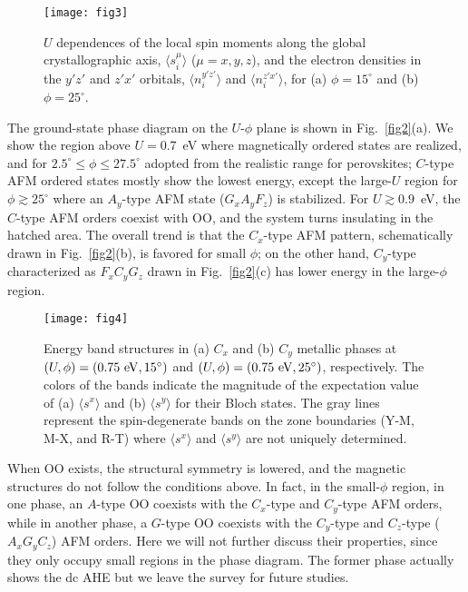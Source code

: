 \documentclass[aps,twocolumn,prb,preprintnumbers,amsmath,amssymb]{revtex4-2}
\begin{document}
\begin{figure}
\begin{center}
\texttt{[image: fig3]}
\end{center}
\caption{
$U$ dependences of the local spin moments along the global crystallographic axis, $\langle s_i^\mu \rangle$ ($\mu=x,y,z$), 
 and the electron densities in the $y'z'$ and $z'x'$ orbitals, $\langle n_i^{y'z'} \rangle$ and  $\langle n_i^{z'x'} \rangle$, 
 for (a) $\phi = 15^\circ$ and (b) $\phi = 25^\circ$. 
}
\label{fig3}
\end{figure}
The ground-state phase diagram on the $U$-$\phi$ plane is shown in Fig.~\ref{fig2}(a). 
We show the region above $U = 0.7$~eV where magnetically ordered states are realized, 
 and for $2.5^\circ \leq \phi \leq 27.5^\circ$ adopted from the realistic range for perovskites; 
 $C$-type AFM ordered states mostly show the lowest energy, 
 except the large-$U$ region for $\phi \gtrsim 25^\circ$ where an $A_y$-type AFM state ($G_x A_y F_z$) is stabilized. 
For $U \gtrsim 0.9$~eV, the $C$-type AFM orders coexist with OO, 
 and the system turns insulating in the hatched area. 
The overall trend is that the $C_x$-type AFM pattern, 
 schematically drawn in Fig.~\ref{fig2}(b), is favored for small $\phi$; 
 on the other hand, $C_y$-type characterized as $F_x C_y G_z$ drawn
 in Fig.~\ref{fig2}(c) has lower energy in the large-$\phi$ region. 
\begin{figure*}
\begin{center}
\texttt{[image: fig4]}
\end{center}
\caption{
Energy band structures in (a) $C_x$  and (b) $C_y$ metallic phases 
 at $(U, \phi) = (0.75 \ \rm{eV}, 15^\circ)$ and $(U, \phi) = (0.75 \ \rm{eV}, 25^\circ)$, respectively. 
The colors of the bands indicate the magnitude of the expectation value of 
 (a) $\langle s^x \rangle$ and (b) $\langle s^y \rangle$ for their Bloch states. 
The gray lines represent the spin-degenerate bands on the zone boundaries (Y-M, M-X, and R-T) 
 where $\langle s^x \rangle$ and $\langle s^y \rangle$ are not uniquely determined. 
}
\label{fig4}
\end{figure*}

When OO exists, the structural symmetry is lowered, 
 and the magnetic structures do not follow the conditions above. 
In fact, in the small-$\phi$ region,  
 in one phase, an $A$-type OO coexists with the $C_x$-type and $C_y$-type AFM orders, 
 while in another phase, a $G$-type OO coexists with the  $C_y$-type and $C_z$-type ($A_x G_y C_z$) AFM orders. 
Here we will not further discuss their properties, 
 since they only occupy small regions in the phase diagram. 
The former phase actually shows the dc AHE but we leave the survey for future studies. 
\end{document}
